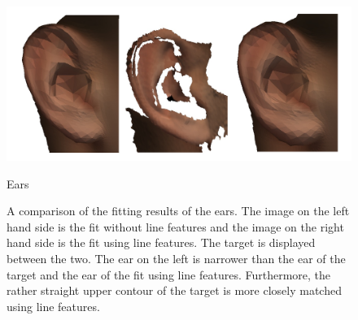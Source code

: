 \begin{figure}[h!]
    \centering
    \includegraphics[width=\textwidth]{./resources/img/00029_left_ear_comparison.pdf}
\caption{Ears}
\label{fig:fitears}
\caption{A comparison of the fitting results of the ears. The image on the left hand side is the fit without line features and the image on the right hand side is the fit using line features. The target is displayed between the two. The ear on the left is narrower than the ear of the target and the ear of the fit using line features. Furthermore, the rather straight upper contour of the target is more closely matched using line features.}
\end{figure}

